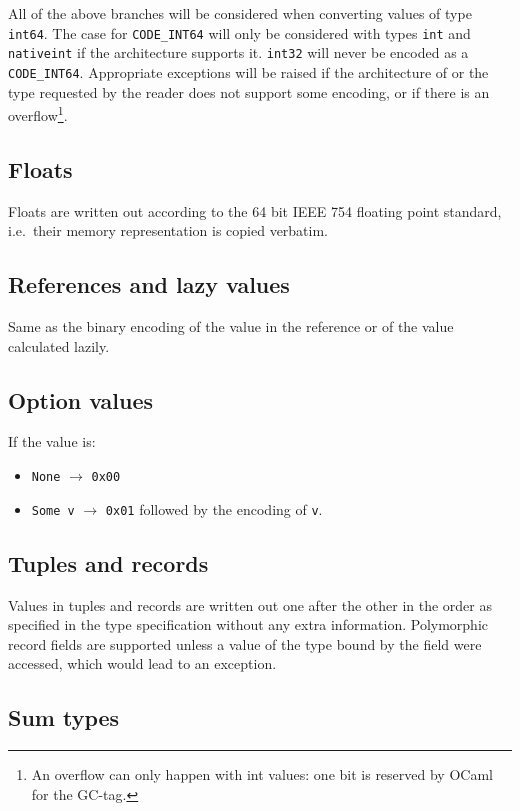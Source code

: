 \documentclass[12pt]{article}
\begin{document}
All of the above branches will be considered when converting values of
type \verb=int64=.  The case for \verb=CODE_INT64= will only be considered
with types \verb=int= and \verb=nativeint= if the architecture supports it.
\verb=int32= will never be encoded as a \verb=CODE_INT64=.  Appropriate
exceptions will be raised if the architecture of or the type requested by the
reader does not support some encoding, or if there is an overflow\footnote{An
overflow can only happen with int values: one bit is reserved by OCaml for
the GC-tag.}.

\subsection{Floats}

Floats are written out according to the 64 bit IEEE 754 floating point
standard, i.e.\ their memory representation is copied verbatim.

\subsection{References and lazy values}

Same as the binary encoding of the value in the reference or of the value
calculated lazily.

\subsection{Option values}

If the value is:

\begin{itemize}
\item \verb=None= $\rightarrow$ \verb=0x00=
\item \verb=Some v= $\rightarrow$ \verb=0x01= followed by the encoding of \verb=v=.
\end{itemize}

\subsection{Tuples and records}

Values in tuples and records are written out one after the other in the
order as specified in the type specification without any extra information.
Polymorphic record fields are supported unless a value of the type bound by
the field were accessed, which would lead to an exception.

\subsection{Sum types}
\end{document}
